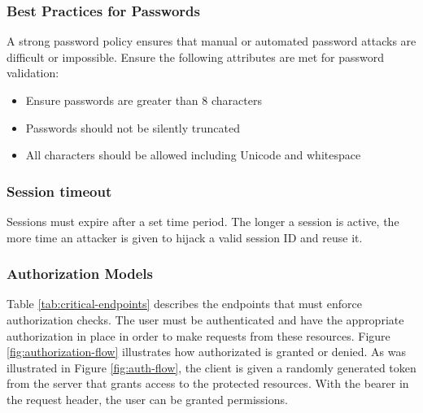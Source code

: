 \subsubsection{Best Practices for Passwords}
A strong password policy ensures that manual or automated password attacks are difficult or impossible. Ensure the following attributes are met for password validation:

\begin{itemize}
    \item Ensure passwords are greater than 8 characters
    \item Passwords should not be silently truncated
    \item All characters should be allowed including Unicode and whitespace
\end{itemize}

\subsubsection{Session timeout}
Sessions must expire after a set time period. The longer a session is active, the more time an attacker is given to hijack a valid session ID and reuse it.

\subsubsection{Authorization Models}
Table \ref{tab:critical-endpoints} describes the endpoints that must enforce authorization checks. The user must be authenticated and have the appropriate authorization in place in order to make requests from these resources. Figure \ref{fig:authorization-flow} illustrates how authorizated is granted or denied. As was illustrated in Figure \ref{fig:auth-flow}, the client is given a randomly generated token from the server that grants access to the protected resources. With the bearer in the request header, the user can be granted permissions.

